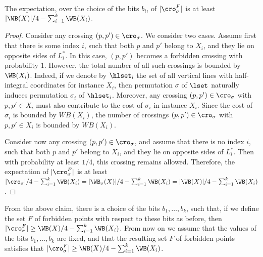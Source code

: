 \documentclass{toc}
\begin{document}
\begin{claim}\label{claim: many expected crossings}
	The expectation, over the choice of the bits $b_i$, of $|\cro^F_{\sigma}|$ is at least $|\WB(X)|/4-\sum_{i=1}^k\WB(X_i)$.
\end{claim}

\begin{proof}
	Consider any crossing $(p,p')\in \cro_{\sigma}$. We consider two cases. Assume first that there is some index $i$, such that both $p$ and $p'$ belong to $X_i$, and they lie on opposite sides of $L^*_i$. In this case, $(p,p')$ becomes a forbidden crossing with probability $1$. However, the total number of all such crossings is bounded by $\WB(X_i)$. Indeed, if we denote by $\hlset_i$ the set of all vertical lines with half-integral coordinates for instance $X_i$, then permutation $\sigma$ of $\lset$ naturally induces permutation $\sigma_i$ of $\hlset_i$. Moreover, any crossing $(p,p')\in\cro_{\sigma}$ with $p,p'\in X_i$ must also contribute to the cost of $\sigma_i$ in instance $X_i$. Since the cost of $\sigma_i$ is bounded by $WB(X_i)$, the number of crossings  $(p,p')\in \cro_{\sigma}$ with $p,p'\in X_i$ is bounded by $WB(X_i)$.
	
	Consider now any crossing $(p,p')\in \cro_{\sigma}$, and assume that there is no  index $i$, such that both $p$ and $p'$ belong to $X_i$, and they lie on opposite sides of $L^*_i$. Then with probability at least $1/4$, this crossing remains allowed. Therefore, the expectation of $|\cro^F_{\sigma}|$ is at least $|\cro_{\sigma}|/4-\sum_{i=1}^k\WB(X_i)=|\WB_{\sigma}(X)|/4-\sum_{i=1}^k\WB(X_i)=|\WB(X)|/4-\sum_{i=1}^k\WB(X_i) $.
\end{proof}


From the above claim, there is a choice of the bits $b_1,\ldots,b_k$, such that, if we define the set $F$ of forbidden points with respect to these bits as before, then $|\cro^F_{\sigma}|\geq \WB(X)/4-\sum_{i=1}^k\WB(X_i)$. From now on we assume that the values of the bits $b_1,\ldots,b_k$ are fixed, and that the resulting set $F$ of forbidden points satisfies that $|\cro^F_{\sigma}|\geq \WB(X)/4-\sum_{i=1}^k\WB(X_i)$.


%
%
%
%
\end{document}
